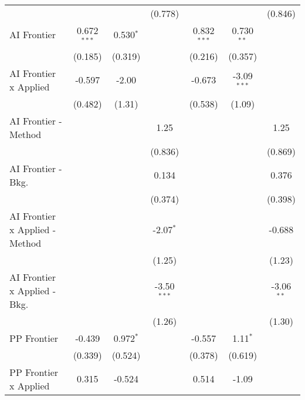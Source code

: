 \begin{tabular}{lcccccc}
                                  &               &               & (0.778)       &                &               & (0.846)\\   
   AI Frontier                    & 0.672$^{***}$ & 0.530$^{*}$   &               & 0.832$^{***}$  & 0.730$^{**}$  &   \\   
                                  & (0.185)       & (0.319)       &               & (0.216)        & (0.357)       &   \\   
   AI Frontier x Applied          & -0.597        & -2.00         &               & -0.673         & -3.09$^{***}$ &   \\   
                                  & (0.482)       & (1.31)        &               & (0.538)        & (1.09)        &   \\   
   AI Frontier - Method           &               &               & 1.25          &                &               & 1.25\\   
                                  &               &               & (0.836)       &                &               & (0.869)\\   
   AI Frontier - Bkg.             &               &               & 0.134         &                &               & 0.376\\   
                                  &               &               & (0.374)       &                &               & (0.398)\\   
   AI Frontier x Applied - Method &               &               & -2.07$^{*}$   &                &               & -0.688\\   
                                  &               &               & (1.25)        &                &               & (1.23)\\   
   AI Frontier x Applied - Bkg.   &               &               & -3.50$^{***}$ &                &               & -3.06$^{**}$\\   
                                  &               &               & (1.26)        &                &               & (1.30)\\   
   PP Frontier                    & -0.439        & 0.972$^{*}$   &               & -0.557         & 1.11$^{*}$    &   \\   
                                  & (0.339)       & (0.524)       &               & (0.378)        & (0.619)       &   \\   
   PP Frontier x Applied          & 0.315         & -0.524        &               & 0.514          & -1.09         &   \\   

\end{tabular}

